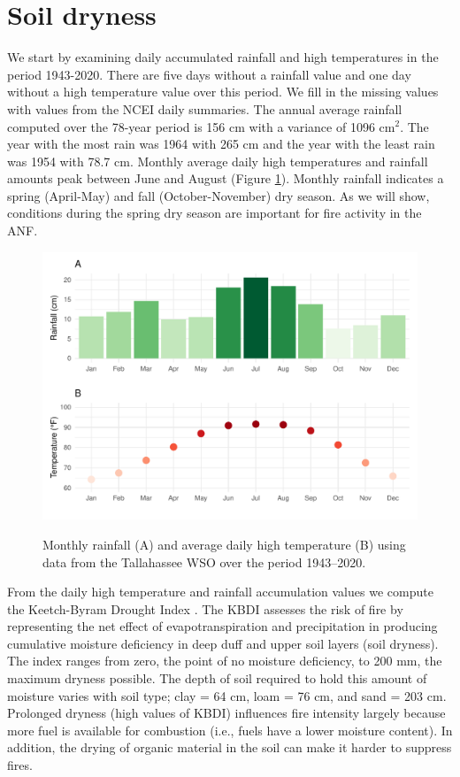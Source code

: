 \documentclass[12pt]{iopart}
\begin{document}
\section{Soil dryness}

We start by examining daily accumulated rainfall and high temperatures in the period 1943-2020. There are five days without a rainfall value and one day without a high temperature value over this period. We fill in the missing values with values from the NCEI daily summaries. The annual average rainfall computed over the 78-year period is 156 cm with a variance of 1096 cm$^2$. The year with the most rain was 1964 with 265 cm and the year with the least rain was 1954 with 78.7 cm. Monthly average daily high temperatures and rainfall amounts peak between June and August (Figure \ref{MonthlyRainTemp}). Monthly rainfall indicates a spring (April-May) and fall (October-November) dry season. As we will show, conditions during the spring dry season are important for fire activity in the ANF. 

\begin{figure}[t]
\noindent\includegraphics[scale=.8,trim=0in 0in 0in 0in,clip]{MonthlyRainTemp.pdf}\\
\vspace{-.25in}
\caption{Monthly rainfall (A) and average daily high temperature (B) using data from the Tallahassee WSO over the period 1943--2020.}
\label{MonthlyRainTemp}
\end{figure}

From the daily high temperature and rainfall accumulation values we compute the Keetch-Byram Drought Index \citep{KeetchByram1968}. The KBDI assesses the risk of fire by representing the net effect of evapotranspiration and precipitation in producing cumulative moisture deficiency in deep duff and upper soil layers (soil dryness). The index ranges from zero, the point of no moisture deficiency, to 200 mm, the maximum dryness possible. The depth of soil required to hold this amount of moisture varies with soil type; clay = 64 cm, loam = 76 cm, and sand = 203 cm. Prolonged dryness (high values of KBDI) influences fire intensity largely because more fuel is available for combustion (i.e., fuels have a lower moisture content). In addition, the drying of organic material in the soil can make it harder to suppress fires.  
\end{document}
